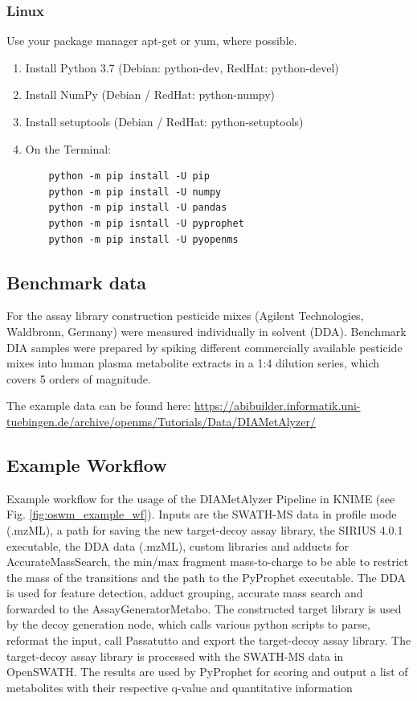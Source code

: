 \subsubsection{Linux}
Use your package manager apt-get or yum, where possible.
\begin{enumerate}
  \item Install Python 3.7 (Debian: python-dev, RedHat: python-devel)
  \item Install NumPy (Debian / RedHat: python-numpy)
  \item Install setuptools (Debian / RedHat: python-setuptools)
  \item On the Terminal:
    \begin{lstlisting}
    python -m pip install -U pip
    python -m pip install -U numpy
    python -m pip install -U pandas
    python -m pip isntall -U pyprophet
    python -m pip install -U pyopenms
    \end{lstlisting}
\end{enumerate}

\subsection{Benchmark data}
For the assay library construction pesticide mixes (Agilent Technologies, Waldbronn, Germany) were measured individually in solvent (DDA). 
Benchmark DIA samples were prepared by spiking different commercially available pesticide mixes into human plasma metabolite extracts in a 1:4 dilution series, which covers 5 orders of magnitude.

\noindent The example data can be found here:
\url{https://abibuilder.informatik.uni-tuebingen.de/archive/openms/Tutorials/Data/DIAMetAlyzer/}

\subsection{Example Workflow}
Example workflow for the usage of the DIAMetAlyzer Pipeline in KNIME (see Fig. \ref{fig:oswm_example_wf}). Inputs are the SWATH-MS data in profile mode (.mzML), a path for saving the new target-decoy assay library, the SIRIUS 4.0.1 executable, the DDA data (.mzML), custom libraries and adducts for AccurateMassSearch, the min/max fragment mass-to-charge to be able to restrict the mass of the transitions and the path to the PyProphet executable. The DDA is used for feature detection, adduct grouping, accurate mass search and forwarded to the AssayGeneratorMetabo. The constructed target library is used by the decoy generation node, which calls various python scripts to parse, reformat the input, call Passatutto and export the target-decoy assay library. The target-decoy assay library is processed with the SWATH-MS data in OpenSWATH. The results are used by PyProphet for scoring and output a list of metabolites with their respective q-value and quantitative information

